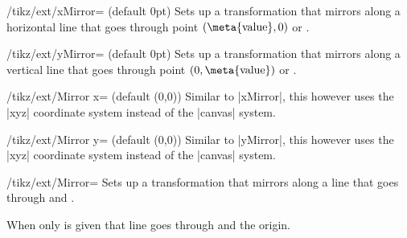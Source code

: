 \begin{key}{/tikz/ext/xMirror= (default 0pt)}
  Sets up a transformation that mirrors along a horizontal line that goes through point $(\text{\meta{value}}, 0)$ or .

\begin{codeexample}[preamble=\usetikzlibrary{ext.transformations.mirror}]
\end{codeexample}
\end{key}

\begin{key}{/tikz/ext/yMirror= (default 0pt)}
  Sets up a transformation that mirrors along a vertical line that goes through point $(0, \text{\meta{value}})$ or .
\end{key}


\begin{key}{/tikz/ext/Mirror x= (default {(0,0)})}
  Similar to |xMirror|, this however uses the |xyz| coordinate system instead of the |canvas| system.
\begin{codeexample}[preamble=\usetikzlibrary{ext.transformations.mirror}]
\end{codeexample}
\end{key}

\begin{key}{/tikz/ext/Mirror y= (default {(0,0)})}
  Similar to |yMirror|, this however uses the |xyz| coordinate system instead of the |canvas| system.
\end{key}


\begin{key}{/tikz/ext/Mirror=}
  Sets up a transformation that mirrors along a line that goes through  and .
  
  When only  is given that line goes through  and the origin.
\end{key}

\endinput